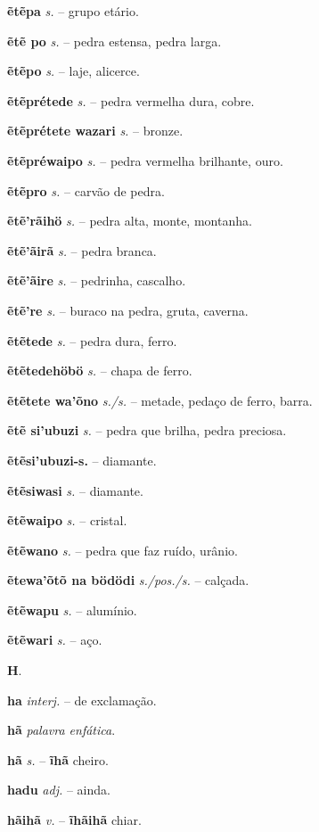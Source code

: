 \textbf{ẽtẽpa} \textit{s.} -- grupo etário.

\textbf{ẽtẽ po} \textit{s.} -- pedra estensa, pedra larga.

\textbf{ẽtẽpo} \textit{s.} -- laje, alicerce.

\textbf{ẽtẽprétede} \textit{s.} -- pedra vermelha dura, cobre.

\textbf{ẽtẽprétete wazari} \textit{s.} -- bronze.

\textbf{ẽtẽpréwaipo} \textit{s.} -- pedra vermelha brilhante, ouro.

\textbf{ẽtẽpro} \textit{s.} -- carvão de pedra.

\textbf{ẽtẽ'rãihö} \textit{s.} -- pedra alta, monte, montanha.

\textbf{ẽtẽ'ãirã} \textit{s.} -- pedra branca.

\textbf{ẽtẽ'ãire} \textit{s.} -- pedrinha, cascalho.

\textbf{ẽtẽ're} \textit{s.} -- buraco na pedra, gruta, caverna.

\textbf{ẽtẽtede} \textit{s.} -- pedra dura, ferro.

\textbf{ẽtẽtedehöbö} \textit{s.} -- chapa de ferro.

\textbf{ẽtẽtete wa'õno} \textit{s./s.} -- metade, pedaço de ferro, barra.

\textbf{ẽtẽ si'ubuzi} \textit{s.} -- pedra que brilha, pedra preciosa.

\textbf{ẽtẽsi'ubuzi-s.} -- diamante.

\textbf{ẽtẽsiwasi} \textit{s.} -- diamante.

\textbf{ẽtẽwaipo} \textit{s.} -- cristal.

\textbf{ẽtẽwano} \textit{s.} -- pedra que faz ruído, urânio.

\textbf{ẽtewa'õtõ na bödödi} \textit{s./pos./s.} -- calçada.

\textbf{ẽtẽwapu} \textit{s.} -- alumínio.

\textbf{ẽtẽwari} \textit{s.} -- aço.



\textbf{H}.



\textbf{ha} \textit{interj.} -- de exclamação.

\textbf{hã} \textit{palavra enfática}.

\textbf{hã} \textit{s.} -- \textbf{ĩhã} cheiro.

\textbf{hadu} \textit{adj.} -- ainda.

\textbf{hãihã} \textit{v.} -- \textbf{ĩhãihã} chiar.

